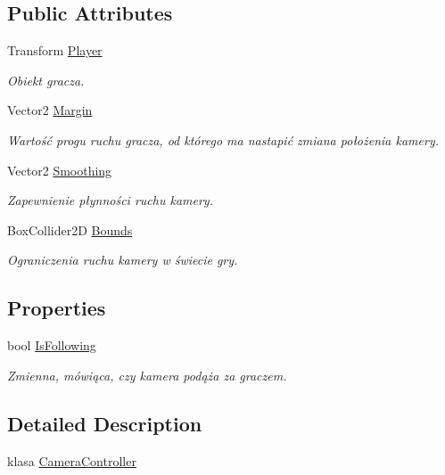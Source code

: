 \subsection*{Public Attributes}
\begin{DoxyCompactItemize}
\item 
Transform \hyperlink{class_camera_controller_a0028f1f6c8d940c36cfb6f6ea77b8658}{Player}
\begin{DoxyCompactList}\small\item\em Obiekt gracza. \end{DoxyCompactList}\item 
Vector2 \hyperlink{class_camera_controller_a8c93ba738eeff2eb5af4bc2bc4ec3f10}{Margin}
\begin{DoxyCompactList}\small\item\em Wartość progu ruchu gracza, od którego ma nastapić zmiana położenia kamery. \end{DoxyCompactList}\item 
Vector2 \hyperlink{class_camera_controller_aaa266990dfb97f6e19d4dd6489f683ef}{Smoothing}
\begin{DoxyCompactList}\small\item\em Zapewnienie płynności ruchu kamery. \end{DoxyCompactList}\item 
Box\+Collider2\+D \hyperlink{class_camera_controller_aad472aa9d9410f6b05884b0d4d336d45}{Bounds}
\begin{DoxyCompactList}\small\item\em Ograniczenia ruchu kamery w świecie gry. \end{DoxyCompactList}\end{DoxyCompactItemize}
\subsection*{Properties}
\begin{DoxyCompactItemize}
\item 
bool \hyperlink{class_camera_controller_a1eb503b3ec9f5c4b2f267e859ba37467}{Is\+Following}
\begin{DoxyCompactList}\small\item\em Zmienna, mówiąca, czy kamera podąża za graczem. \end{DoxyCompactList}\end{DoxyCompactItemize}


\subsection{Detailed Description}
klasa \hyperlink{class_camera_controller}{Camera\+Controller} 



